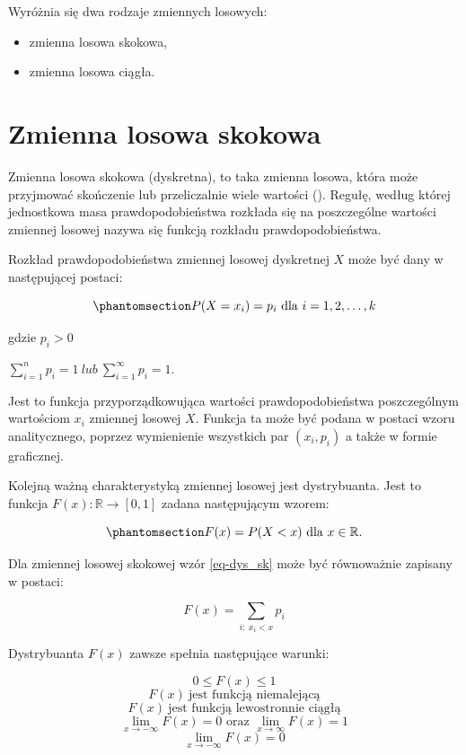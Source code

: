\documentclass[
  letterpaper,
  DIV=11,
  numbers=noendperiod]{scrreprt}
\begin{document}
Wyróżnia się dwa rodzaje zmiennych losowych:

\begin{itemize}
\item
  zmienna losowa skokowa,
\item
  zmienna losowa ciągła.
\end{itemize}

\section{Zmienna losowa skokowa}\label{zmienna-losowa-skokowa}

Zmienna losowa skokowa (dyskretna), to taka zmienna losowa, która może
przyjmować skończenie lub przeliczalnie wiele wartości
(). Regułę, według
której jednostkowa masa prawdopodobieństwa rozkłada się na poszczególne
wartości zmiennej losowej nazywa się funkcją rozkładu
prawdopodobieństwa.

Rozkład prawdopodobieństwa zmiennej losowej dyskretnej \(X\) może być
dany w następującej postaci:

\begin{equation}\phantomsection\label{eq-rp_sk}{ P(X=x_i)= p_i \  \text{dla} \  i = 1, 2, \ldots, k}\end{equation}

gdzie \(p_i > 0\)

\(\sum_{i=1}^n p_i = 1 \ lub \  \sum_{i=1}^{\infty} p_i = 1\).

Jest to funkcja przyporządkowująca wartości prawdopodobieństwa
poszczególnym wartościom \(x_i\) zmiennej losowej \(X\). Funkcja ta może
być podana w postaci wzoru analitycznego, poprzez wymienienie wszystkich
par \((x_i, p_i)\) a także w formie graficznej.

Kolejną ważną charakterystyką zmiennej losowej jest dystrybuanta. Jest
to funkcja \(F(x): \mathbb{R} \to [0, 1]\) zadana następującym wzorem:

\begin{equation}\phantomsection\label{eq-dys_sk}{ F(x) = P(X <x) \text{ dla } x \in \mathbb{R}.}\end{equation}

Dla zmiennej losowej skokowej wzór \ref{eq-dys_sk} może być równoważnie
zapisany w postaci:

\[F(x) = \sum_{i: \ x_i<x}p_i\]

Dystrybuanta \(F(x)\) zawsze spełnia następujące warunki:

\[0 \le F(x) \le 1\] \[F(x) \ \text{jest funkcją niemalejącą}\]
\[F(x) \ \text{jest funkcją lewostronnie ciągłą}\]
\[\lim_{x \to -\infty} F(x) = 0 \text{ oraz } \lim_{x \to \infty}F(x) = 1\]
\[\lim_{x \to -\infty} F(x) = 0\]
\end{document}

